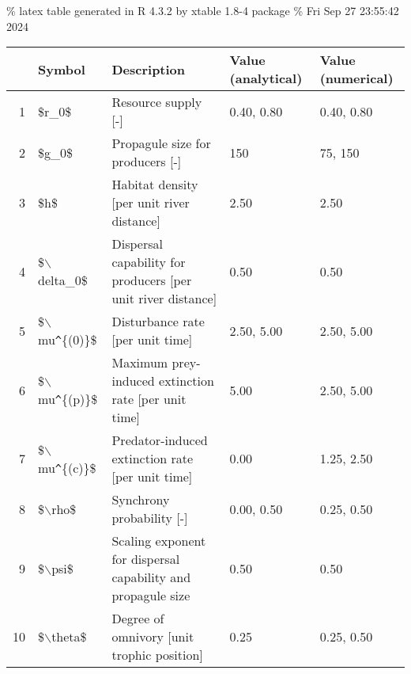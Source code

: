 \% latex table generated in R 4.3.2 by xtable 1.8-4 package \% Fri Sep
27 23:55:42 2024

\begin{table}[ht]
\centering
\begin{tabular}{rllll}
  \hline
 & Symbol & Description & Value (analytical) & Value (numerical) \\ 
  \hline
1 & \$r\_0\$ & Resource supply [-] & 0.40, 0.80 & 0.40, 0.80 \\ 
  2 & \$g\_0\$ & Propagule size for producers [-] & 150 & 75, 150 \\ 
  3 & \$h\$ & Habitat density [per unit river distance] & 2.50 & 2.50 \\ 
  4 & \$$\backslash$delta\_0\$ & Dispersal capability for producers [per unit river distance] & 0.50 & 0.50 \\ 
  5 & \$$\backslash$mu\verb|^|\{(0)\}\$ & Disturbance rate [per unit time] & 2.50, 5.00 & 2.50, 5.00 \\ 
  6 & \$$\backslash$mu\verb|^|\{(p)\}\$ & Maximum prey-induced extinction rate [per unit time] & 5.00 & 2.50, 5.00 \\ 
  7 & \$$\backslash$mu\verb|^|\{(c)\}\$ & Predator-induced extinction rate [per unit time] & 0.00 & 1.25, 2.50 \\ 
  8 & \$$\backslash$rho\$ & Synchrony probability [-] & 0.00, 0.50 & 0.25, 0.50 \\ 
  9 & \$$\backslash$psi\$ & Scaling exponent for dispersal capability and propagule size & 0.50 & 0.50 \\ 
  10 & \$$\backslash$theta\$ & Degree of omnivory [unit trophic position] & 0.25 & 0.25, 0.50 \\ 
   \hline
\end{tabular}
\end{table}
